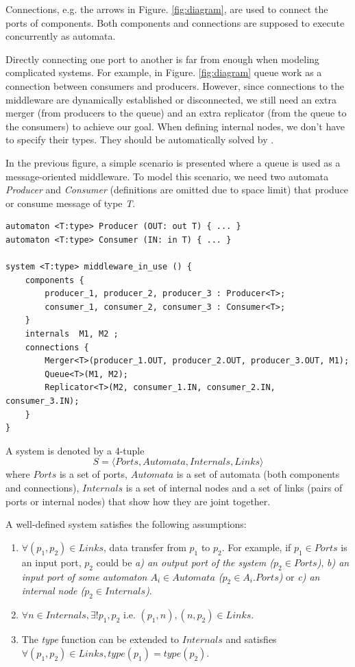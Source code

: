  Connections, e.g. the arrows in Figure. \ref{fig:diagram}, are used to connect the ports of components.
Both components and connections are supposed to execute concurrently as automata.

 Directly connecting one port to another is far from enough when modeling complicated systems. For example, in Figure. \ref{fig:diagram} queue work as a connection between consumers and producers. However, since connections to the middleware are dynamically established or disconnected, we still need an extra merger (from producers to the queue) and an extra replicator (from the queue to the consumers) to achieve our goal. When defining internal nodes, we don't have to specify their types. They should be automatically solved by \lang{}.

\begin{example} In the previous figure, a simple scenario is presented where a queue is used as a message-oriented middleware. To model this scenario, we need two automata \emph{Producer} and \emph{Consumer} (definitions are omitted due to space limit) that produce or consume message of type \emph{T}.
\begin{lstlisting}
automaton <T:type> Producer (OUT: out T) { ... }
automaton <T:type> Consumer (IN: in T) { ... }

system <T:type> middleware_in_use () {
    components {
        producer_1, producer_2, producer_3 : Producer<T>;
        consumer_1, consumer_2, consumer_3 : Consumer<T>;
    }
    internals  M1, M2 ;
    connections {
        Merger<T>(producer_1.OUT, producer_2.OUT, producer_3.OUT, M1);
        Queue<T>(M1, M2);
        Replicator<T>(M2, consumer_1.IN, consumer_2.IN, consumer_3.IN);
    }
}
\end{lstlisting}
\end{example}

\begin{formalization}[System]
    A system is denoted by a 4-tuple
    \[
        S=\langle Ports, Automata, Internals, Links\rangle
    \] where $Ports$ is a set of ports, $Automata$ is a set of automata (both components and connections), $Internals$ is a set of internal nodes and a set of links (pairs of ports or internal nodes) that show how they are joint together.
\end{formalization}
A well-defined system satisfies the following assumptions:
\begin{enumerate}
    \item $\forall (p_1,p_2)\in Links$, data transfer from $p_1$ to $p_2$. For example, if $p_1\in Ports$ is an input port, $p_2$ could be \emph{a) an output port of the system ($p_2\in Ports$)}, \emph{b) an input port of some automaton $A_i\in Automata$ ($p_2\in A_i.Ports$)} or \emph{c) an internal node ($p_2\in Internals$)}.
    \item $\forall n\in Internals,\exists!p_1,p_2$ i.e. $(p_1,n),(n,p_2)\in Links$.
    \item The \emph{type} function can be extended to $Internals$ and satisfies $\forall (p_1,p_2)\in Links, type(p_1)=type(p_2)$.
\end{enumerate}

\label{subsec:functions}